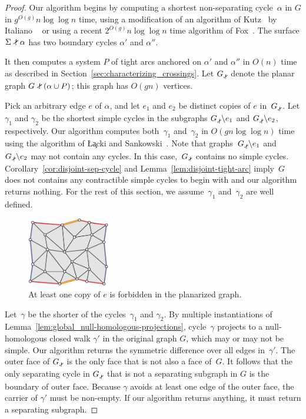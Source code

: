 \documentclass[11pt,twoside]{article}
\def\snip{\mathbin{\raisebox{0.15ex}{\rotatebox[origin=c]{60}{\Rightscissors}\!}}}
\def\subsnip{\mathbin{\raisebox{0.15ex}{\rotatebox[origin=c]{60}{\footnotesize\Rightscissors}\!}}}
\def\Gsnip{\mathord{G_{\subsnip}}}
\def\snip{\mathbin{\raisebox{0.15ex}{\rotatebox[origin=c]{60}{\Rightscissors}\!}}}
\begin{document}
{\begin{proof}
Our algorithm begins by computing a shortest non-separating cycle~$\alpha$ in $G$ in $g^{O(g)}n \log \log n$ time, using a modification of an algorithm of Kutz~\cite{k-csnco-06} by Italiano \etal~\cite{insw-iamcmf-11} or using a recent $2^{O(g)}n \log \log n$ time algorithm of Fox~\cite{f-sntcd-13}.  The surface $\Sigma \snip \alpha$ has two boundary cycles $\alpha'$ and $\alpha''$.

It then computes a system $P$ of tight arcs anchored on $\alpha'$ and $\alpha''$ in $O(n)$ time as described in Section~\ref{sec:characterizing_crossings}.
Let $\Gsnip$ denote the planar graph $G \snip (\alpha \cup P)$; this graph has $O(gn)$ vertices.

Pick an arbitrary edge $e$ of $\alpha$, and let $e_1$ and $e_2$ be distinct copies of $e$ in~$\Gsnip$.  Let $\gamma_1$ and $\gamma_2$ be the shortest simple cycles in the  subgraphs $\Gsnip \backslash e_1$ and $\Gsnip \backslash e_2$, respectively.  Our algorithm computes both~$\gamma_1$ and~$\gamma_2$ in $O(gn \log\log n)$ time using the algorithm of \L\c{a}cki and Sankowski~\cite{ls-mcsc-11}. Note that graphs~$\Gsnip \backslash e_1$ and~$\Gsnip \backslash e_2$ may not contain any cycles. In this case,~$\Gsnip$ contains no simple cycles. Corollary~\ref{cor:disjoint-sep-cycle} and Lemma~\ref{lem:disjoint-tight-arc} imply~$G$ does not contains any contractible simple cycles to begin with and our algorithm returns nothing. For the rest of this section, we assume~$\gamma_1$ and~$\gamma_2$ are well defined.

\begin{figure}[ht]
\centering
\includegraphics[height=1.2in]{Fig/forbidden-pair}
\caption{At least one copy of $e$ is forbidden in the planarized graph.}
\label{fig:global_forbidden-pair}
\end{figure}

Let~$\gamma$ be the shorter of the cycles~$\gamma_1$ and $\gamma_2$.  By multiple instantiations of Lemma~\ref{lem:global_null-homologous-projections}, cycle~$\gamma$ projects to a null-homologous closed walk $\gamma'$ in the original graph $G$, which may or may not be simple.
Our algorithm returns the symmetric difference over all edges in~$\gamma'$. The outer face of $\Gsnip$ is the only face that is not also a face of~$G$.
It follows that the only separating cycle in $\Gsnip$ that is not a separating subgraph in $G$ is the boundary of outer face.  Because $\gamma$ avoids at least one edge of the outer face, the carrier of $\gamma'$ must be non-empty. If our algorithm returns anything, it must return a separating subgraph.


\end{proof}}
\end{document}
